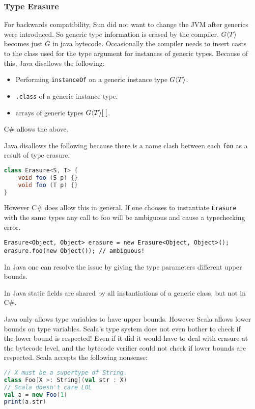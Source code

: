 \documentclass{article}
\begin{document}
\subsubsection{Type Erasure}

For backwards compatibility, Sun did not want to change the JVM after generics were introduced. So generic type information is erased by the compiler. $G \langle T \rangle$ becomes just $G$ in java bytecode. Occasionally the compiler needs to insert casts to the class used for the type argument for instances of generic types. Because of this, Java disallows the following:
\begin{itemize}
\item Performing \texttt{instanceOf} on a generic instance type $G \langle T \rangle$.
\item \texttt{.class} of a generic instance type.
\item arrays of generic types $G \langle T \rangle[~]$.
\end{itemize}

C\# allows the above.

\begin{example}
Java disallows the following because there is a name clash between each \texttt{foo} as a result of type erasure.
\begin{lstlisting}[escapechar=|, language=Java]
class Erasure<S, T> {
    void foo (S p) {}
    void foo (T p) {}
}
\end{lstlisting}
However C\# does allow this in general.
If one chooses to instantiate \texttt{Erasure} with the same types any call to foo will be ambiguous and cause a typechecking error.
\begin{lstlisting}[escapechar=|, language={[Sharp]C}]
Erasure<Object, Object> erasure = new Erasure<Object, Object>();
erasure.foo(new Object()); // ambiguous!
\end{lstlisting}
In Java one can resolve the issue by giving the type parameters different upper bounds.
\end{example}

In Java static fields are shared by all instantiations of a generic class, but not in C\#.

\begin{example}
  Java only allows type variables to have upper bounds.
  However Scala allows lower bounds on type variables.
  Scala's type system does not even bother to check if the lower bound is respected!
  Even if it did it would have to deal with erasure at the bytecode level,
  and the bytecode verifier could not check if lower bounds are respected.
  Scala accepts the following nonsense:
\begin{lstlisting}[escapechar=|, language=Scala]
// X must be a supertype of String.
class Foo[X >: String](val str : X)
// Scala doesn't care LOL
val a = new Foo(1)
print(a.str)
\end{lstlisting}
\end{example}
\end{document}
